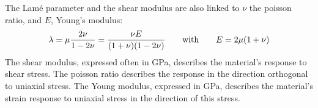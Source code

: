 
The Lam\'e parameter and the shear modulus are also linked to $\nu$ the poisson ratio, 
and $E$, Young's modulus:  
\[
\lambda=\mu\frac{2\nu}{1-2\nu}
=\frac{\nu E}{(1+\nu)(1-2\nu)}
\quad\quad
{\rm with}
\quad\quad
E=2\mu(1+\nu)
\]
The shear modulus, expressed often in GPa, describes the material's response to shear stress.
The poisson ratio describes the response in the direction orthogonal to uniaxial stress.
The Young modulus, expressed in GPa, describes the material's strain response to uniaxial stress in the 
direction of this stress.









